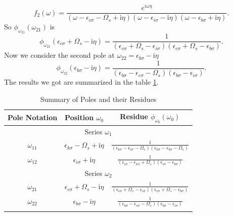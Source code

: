 \documentclass[12pt]{caltech_thesis}
\begin{document}
\begin{equation}
f_2(\omega) = \frac{e^{i\omega \eta }}{(\omega-\epsilon_{c \sigma}-\Omega_s+\mathrm{i} \eta)(\omega-\epsilon_{i \sigma}-\mathrm{i} \eta)(\omega-\epsilon_{b \sigma}+\mathrm{i} \eta)}.
\end{equation}
So $\phi_{\omega_{21}}(\omega _{21})$ is
\begin{equation}
{\phi_{\omega_{21}}(\epsilon_{c \sigma} + \Omega_s - \mathrm{i} \eta) = \frac{1}{(\epsilon_{c \sigma} + \Omega_s -\epsilon_{i \sigma})(\epsilon_{c \sigma} + \Omega_s -\epsilon_{b \sigma})}}.
\end{equation}
Now we consider the second pole at $\omega_{22} = \epsilon _{b \sigma } - \mathrm{i} \eta$
\begin{equation}
{\phi_{\omega_{22}}(\epsilon_{b \sigma} - \mathrm{i} \eta) = \frac{1}{(\epsilon_{b \sigma} -\epsilon_{c \sigma}-\Omega_s)(\epsilon_{b \sigma} -\epsilon_{i \sigma})}}.
\end{equation}
The results we got are summarized in the table \ref{tabpoles_residues_mixed}.\\
\begin{table}[h]
\centering
\caption{Summary of Poles and their Residues}
\begin{tabular}{|c|c|c|}
\hline
Pole Notation & Position $\omega_0$ & Residue $\phi_{\omega_0}(\omega_0)$ \\
\hline
\multicolumn{3}{|c|}{Series $\omega_1$} \\
\hline
$\omega_{11}$ & $\epsilon_{k \sigma} - \Omega_s + \mathrm{i} \eta$ & $\frac{1}{(\epsilon_{k \sigma} -\epsilon_{i \sigma}-\Omega_s)(\epsilon_{k \sigma} -\epsilon_{b \sigma}-\Omega_s)}$ \\
$\omega_{12}$ & $\epsilon_{i \sigma} + \mathrm{i} \eta$ & $\frac{1}{(\epsilon_{i \sigma} -\epsilon_{k \sigma}+\Omega_s)(\epsilon_{i \sigma} -\epsilon_{b \sigma})}$ \\
\hline
\multicolumn{3}{|c|}{Series $\omega_2$} \\
\hline
$\omega_{21}$ & $\epsilon_{c \sigma} + \Omega_s - \mathrm{i} \eta$ & $\frac{1}{(\epsilon_{c \sigma} + \Omega_s -\epsilon_{i \sigma})(\epsilon_{c \sigma} + \Omega_s -\epsilon_{b \sigma})}$ \\
$\omega_{22}$ & $\epsilon_{b \sigma} - \mathrm{i} \eta$ & $\frac{1}{(\epsilon_{b \sigma} -\epsilon_{c \sigma}-\Omega_s)(\epsilon_{b \sigma} -\epsilon_{i \sigma})}$ \\
\hline
\label{tabpoles_residues_mixed}
\end{tabular}
\end{table}
\end{document}
